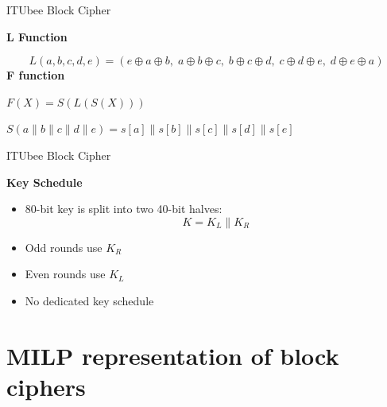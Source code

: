\documentclass{beamer}
\begin{document}
\begin{frame}{ITUbee Block Cipher}

\textbf{L Function} 

\[
L(a,b,c,d,e) = (e\oplus a\oplus b,\; a\oplus b\oplus c,\; b\oplus c\oplus d,\; c\oplus d\oplus e,\; d\oplus e\oplus a)
\]
\textbf{F function} \linebreak
    
    \begin{center}
        $F (X) = S(L(S(X)))$
    \end{center}

    \begin{center}
        $S(a\parallel b \parallel c \parallel d \parallel e) = s[a] \parallel s[b] \parallel s[c] \parallel s[d] \parallel s[e]$ 
    \end{center}

\end{frame}

\begin{frame}{ITUbee Block Cipher}

    \textbf{Key Schedule} \linebreak
    
    \begin{itemize}
    \item 80-bit key is split into two 40-bit halves:
    \[
    K = K_L \parallel K_R
    \]
    \item Odd rounds use $K_R$
    \item Even rounds use $K_L$
    \item No dedicated key schedule
\end{itemize}

\end{frame}



\section{MILP representation of block ciphers}

\end{document}
